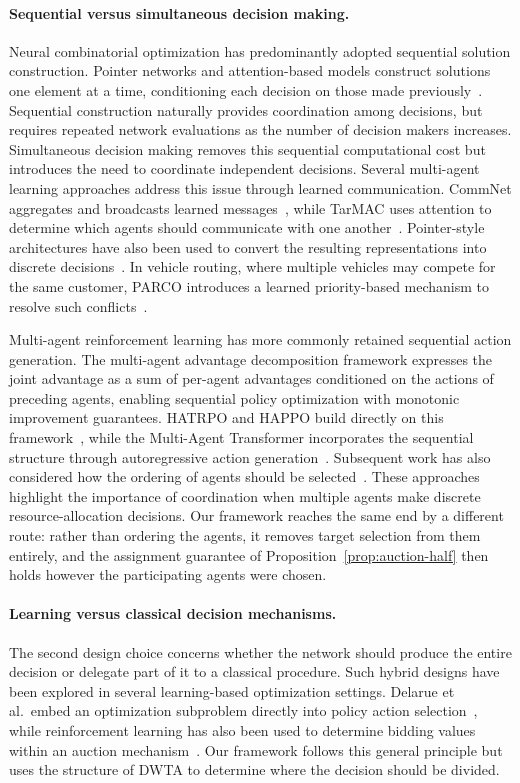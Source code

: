 \paragraph{Sequential versus simultaneous decision making.}
Neural combinatorial optimization has predominantly adopted sequential solution construction. Pointer networks and attention-based models construct solutions one element at a time, conditioning each decision on those made previously~\cite{vinyals2015pointer,kool2018attention,kwon2020pomo}. Sequential construction naturally provides coordination among decisions, but requires repeated network evaluations as the number of decision makers increases. Simultaneous decision making removes this sequential computational cost but introduces the need to coordinate independent decisions. Several multi-agent learning approaches address this issue through learned communication. CommNet aggregates and broadcasts learned messages~\cite{sukhbaatar2016commnet}, while TarMAC uses attention to determine which agents should communicate with one another~\cite{das2019tarmac}. Pointer-style architectures have also been used to convert the resulting representations into discrete decisions~\cite{park2021schedulenet}. In vehicle routing, where multiple vehicles may compete for the same customer, PARCO introduces a learned priority-based mechanism to resolve such conflicts~\cite{parco2024}.

Multi-agent reinforcement learning has more commonly retained sequential action generation. The multi-agent advantage decomposition framework expresses the joint advantage as a sum of per-agent advantages conditioned on the actions of preceding agents, enabling sequential policy optimization with monotonic improvement guarantees. HATRPO and HAPPO build directly on this framework~\cite{kuba2022trust}, while the Multi-Agent Transformer incorporates the sequential structure through autoregressive action generation~\cite{wen2022mat}. Subsequent work has also considered how the ordering of agents should be selected~\cite{wen2022mat}. These approaches highlight the importance of coordination when multiple agents make discrete resource-allocation decisions. Our framework reaches the same end by a different route: rather than ordering the agents, it removes target selection from them entirely, and the assignment guarantee of Proposition~\ref{prop:auction-half} then holds however the participating agents were chosen.

\paragraph{Learning versus classical decision mechanisms.}
The second design choice concerns whether the network should produce the entire decision or delegate part of it to a classical procedure. Such hybrid designs have been explored in several learning-based optimization settings. Delarue et al.\ embed an optimization subproblem directly into policy action selection~\cite{delarue2020rl}, while reinforcement learning has also been used to determine bidding values within an auction mechanism~\cite{sun2026grabbing}. Our framework follows this general principle but uses the structure of DWTA to determine where the decision should be divided.

